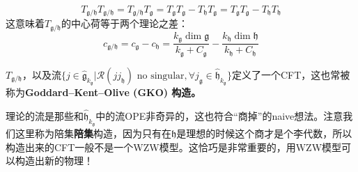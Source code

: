 \begin{equation}
	T_{\mathfrak{g}/\mathfrak{h}}T_{\mathfrak{g}/\mathfrak{h}}=T_{\mathfrak{g}/\mathfrak{h}}T_{\mathfrak{g}}=T_{\mathfrak{g}}T_{\mathfrak{g}}-T_{\mathfrak{h}}T_{\mathfrak{g}}=T_{\mathfrak{g}}T_{\mathfrak{g}}-T_{\mathfrak{h}}T_{\mathfrak{h}}
\end{equation}
这意味着$T_{{\mathfrak{g}/\mathfrak{h}}}$的中心荷等于两个理论之差：
\begin{equation}
	\boxed{
		c_{\mathfrak{g}/\mathfrak{h}}=c_{\mathfrak{g}}-c_{\mathfrak{h}}=\frac{k_{\mathfrak{g}}\dim\mathfrak{g}}{k_{\mathfrak{g}}+C_{\mathfrak{g}}}-\frac{k_{\mathfrak{h}}\dim\mathfrak{h}}{k_{\mathfrak{h}}+C_{\mathfrak{h}}}
	}
\end{equation}
\begin{definition}
	$T_{\mathfrak{g}/\mathfrak{h}}$，以及流$\{j\in\hat{\mathfrak{g}}_{k_\mathfrak{g}}|\mathcal{R}(jj_{\mathfrak{h}}) \text { no singular},\forall j_{\mathfrak{g}}\in \hat{\mathfrak{h}}_{k_\mathfrak{g}}\}$定义了一个CFT，这也常被称为\textbf{Goddard–Kent–Olive
		(GKO) 构造。}
\end{definition}
\begin{remark}
	理论的流是那些和$\hat{\mathfrak{h}}_{k_\mathfrak{g}}$中的流OPE非奇异的，这也符合“商掉”的naive想法。注意我们这里称为陪集\textbf{陪集}构造，因为只有在$\mathfrak{h}$是理想的时候这个商才是个李代数，所以构造出来的CFT一般不是一个WZW模型。这恰巧是非常重要的，用WZW模型可以构造出新的物理！
\end{remark}

